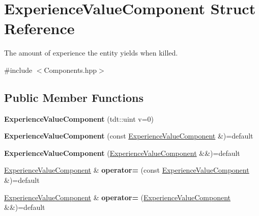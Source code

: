 \hypertarget{struct_experience_value_component}{}\section{Experience\+Value\+Component Struct Reference}
\label{struct_experience_value_component}


The amount of experience the entity yields when killed.  




{\ttfamily \#include $<$Components.\+hpp$>$}

\subsection*{Public Member Functions}
\begin{DoxyCompactItemize}
\item 
{\bfseries Experience\+Value\+Component} (tdt\+::uint v=0)\hypertarget{struct_experience_value_component_a6c771930a164bd7208fc305acc229807}{}\label{struct_experience_value_component_a6c771930a164bd7208fc305acc229807}

\item 
{\bfseries Experience\+Value\+Component} (const \hyperlink{struct_experience_value_component}{Experience\+Value\+Component} \&)=default\hypertarget{struct_experience_value_component_a21c33f33e9fc9c8279b0c5f48ca83ccf}{}\label{struct_experience_value_component_a21c33f33e9fc9c8279b0c5f48ca83ccf}

\item 
{\bfseries Experience\+Value\+Component} (\hyperlink{struct_experience_value_component}{Experience\+Value\+Component} \&\&)=default\hypertarget{struct_experience_value_component_a33518c5195dc24e347836312aefc8fab}{}\label{struct_experience_value_component_a33518c5195dc24e347836312aefc8fab}

\item 
\hyperlink{struct_experience_value_component}{Experience\+Value\+Component} \& {\bfseries operator=} (const \hyperlink{struct_experience_value_component}{Experience\+Value\+Component} \&)=default\hypertarget{struct_experience_value_component_ad055d663d9924442969f5bdf5f95d1c8}{}\label{struct_experience_value_component_ad055d663d9924442969f5bdf5f95d1c8}

\item 
\hyperlink{struct_experience_value_component}{Experience\+Value\+Component} \& {\bfseries operator=} (\hyperlink{struct_experience_value_component}{Experience\+Value\+Component} \&\&)=default\hypertarget{struct_experience_value_component_acc124046259f20bc40b94ce2bc5e60f8}{}\label{struct_experience_value_component_acc124046259f20bc40b94ce2bc5e60f8}

\end{DoxyCompactItemize}
